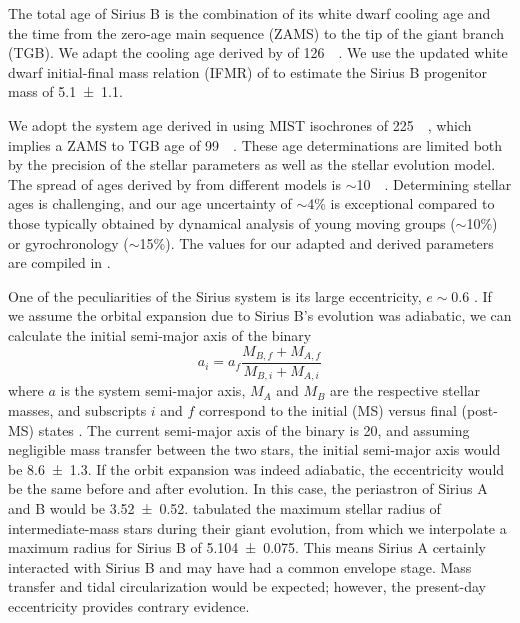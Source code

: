 \documentclass[twocolumn,linenumbers]{aastex631}
\begin{document}
The total age of Sirius B is the combination of its white dwarf cooling age and the time from the zero-age main sequence (ZAMS) to the tip of the giant branch (TGB). We adapt the cooling age derived by \citet[Sec.~8]{bondSiriusSystemIts2017} of \qty{126}{\mega\year}. We use the updated white dwarf initial-final mass relation (IFMR) of \citet{cummingsWhiteDwarfInitialFinal2018} to estimate the Sirius B progenitor mass of \qty{5.1\pm1.1}{\solarmass}.

We adopt the system age derived in \citet{cummingsWhiteDwarfInitialFinal2018} using MIST isochrones of \qty{225}{\mega\year}, which implies a ZAMS to TGB age of \qty{99}{\mega\year}. These age determinations are limited both by the precision of the stellar parameters as well as the stellar evolution model. The spread of ages derived by \citet{cummingsWhiteDwarfInitialFinal2018} from different models is $\sim$\qty{10}{\mega\year}. Determining stellar ages is challenging, and our age uncertainty of $\sim$4\% is exceptional compared to those typically obtained by dynamical analysis of young moving groups ($\sim$10\%) or gyrochronology ($\sim$15\%). The values for our adapted and derived parameters are compiled in .


One of the peculiarities of the Sirius system is its large eccentricity, $e\sim0.6$ \citep{bondSiriusSystemIts2017}. If we assume the orbital expansion due to Sirius B's evolution was adiabatic, we can calculate the initial semi-major axis of the binary
\begin{equation}
    a_i = a_f \frac{M_{B,f} + M_{A,f}}{M_{B,i} + M_{A,i}}
\end{equation}
where $a$ is the system semi-major axis, $M_A$ and $M_B$ are the respective stellar masses, and subscripts $i$ and $f$ correspond to the initial (MS) versus final (post-MS) states \citep{jeansCosmogonicProblemsAssociated1924}. The current semi-major axis of the binary is \qty{20}{\au}, and assuming negligible mass transfer between the two stars, the initial semi-major axis would be \qty{8.6\pm1.3}{\au}. If the orbit expansion was indeed adiabatic, the eccentricity would be the same before and after evolution. In this case, the periastron of Sirius A and B would be \qty{3.52\pm0.52}{\au}. \citet{verasPostmainsequencePlanetarySystem2016} tabulated the maximum stellar radius of intermediate-mass stars during their giant evolution, from which we interpolate a maximum radius for Sirius B of \qty{5.104\pm0.075}{\au}. This means Sirius A certainly interacted with Sirius B and may have had a common envelope stage. Mass transfer and tidal circularization would be expected; however, the present-day eccentricity provides contrary evidence.
\end{document}
